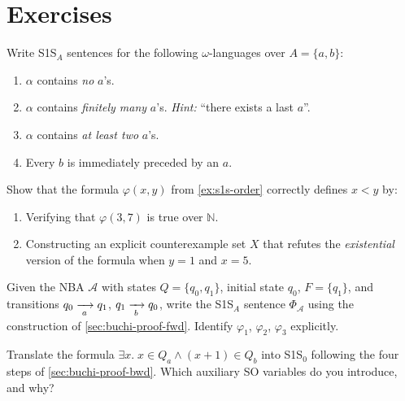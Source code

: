\section*{Exercises}

\begin{chapex}
Write S1S$_A$ sentences for the following $\omega$-languages over
$A = \{a, b\}$:
\begin{enumerate}[nosep,label=(\alph*)]
  \item $\alpha$ contains \emph{no} $a$'s.
  \item $\alpha$ contains \emph{finitely many} $a$'s.
        \emph{Hint:} ``there exists a last $a$''.
  \item $\alpha$ contains \emph{at least two} $a$'s.
  \item Every $b$ is immediately preceded by an $a$.
\end{enumerate}
\end{chapex}

\begin{chapex}
Show that the formula $\varphi(x,y)$ from
\cref{ex:s1s-order} correctly defines $x < y$ by:
\begin{enumerate}[nosep,label=(\alph*)]
  \item Verifying that $\varphi(3, 7)$ is true over $\mathbb{N}$.
  \item Constructing an explicit counterexample set $X$ that refutes
        the \emph{existential} version of the formula when $y = 1$
        and $x = 5$.
\end{enumerate}
\end{chapex}

\begin{chapex}
Given the NBA $\mathcal{A}$ with states $Q = \{q_0, q_1\}$,
initial state $q_0$, $F = \{q_1\}$, and transitions
$q_0 \xrightarrow[{\;a\;}]{} q_1$, $q_1 \xrightarrow[{\;b\;}]{} q_0$,
write the S1S$_A$ sentence $\Phi_{\mathcal{A}}$ using the
construction of \cref{sec:buchi-proof-fwd}.
Identify $\varphi_1$, $\varphi_2$, $\varphi_3$ explicitly.
\end{chapex}

\begin{chapex}[S1S$_0$ translation]
Translate the formula $\exists x.\;x \in Q_a \land (x+1) \in Q_b$
into S1S$_0$ following the four steps of
\cref{sec:buchi-proof-bwd}.
Which auxiliary SO variables do you introduce, and why?
\end{chapex}

